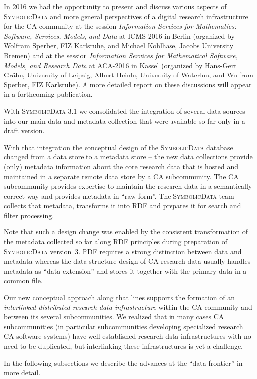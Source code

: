 \documentclass[a4paper,11pt]{article}
\def\SD{\textsc{Symbolic\-Data}}
\begin{document}
\begin{multicols}{2}
In 2016 we had the opportunity to present and discuss various aspects of {\SD}
and more general perspectives of a digital research infrastructure for the CA
community at the session \emph{Information Services for Mathematics: Software,
  Services, Models, and Data} at ICMS-2016 in Berlin (organized by Wolfram
Sperber, FIZ Karlsruhe, and Michael Kohlhase, Jacobs University Bremen) and at
the session \emph{Information Services for Mathematical Software, Models, and
  Research Data} at ACA-2016 in Kassel (organized by Hans-Gert Gr\"abe,
University of Leipzig, Albert Heinle, University of Waterloo, and Wolfram
Sperber, FIZ Karlsruhe).  A more detailed report on these discussions will
appear in a forthcoming publication.

\Ueberschrift{Enlarging the {\SD} Database}{esd}

With {\SD} 3.1 we consolidated the integration of several data sources into
our main data and metadata collection that were available so far only in a
draft version.

With that integration the conceptual design of the {\SD} database changed from
a data store to a metadata store -- the new data collections provide (only)
metadata information about the core research data that is hosted and
maintained in a separate remote data store by a CA subcommunity. The CA
subcommunity provides expertise to maintain the research data in a
semantically correct way and provides metadata in ``raw form''.  The {\SD}
team collects that metadata, transforms it into RDF and prepares it for search
and filter processing.

Note that such a design change was enabled by the consistent transformation of
the metadata collected so far along RDF principles during preparation of {\SD}
version~3.  RDF requires a strong distinction between data and metadata
whereas the data structure design of CA research data usually handles metadata
as ``data extension'' and stores it together with the primary data in a common
file.

Our new conceptual approach along that lines supports the formation of an
\emph{interlinked distributed research data infrastructure} within the CA
community and between its several subcommunities. We realized that in many
cases CA subcommunities (in particular subcommunities developing specialized
research CA software systems) have well established research data
infrastructures with no need to be duplicated, but interlinking these
infrastructures is yet a challenge.

In the following subsections we describe the advances at the ``data frontier''
in more detail.
 

\end{multicols}
\end{document}
